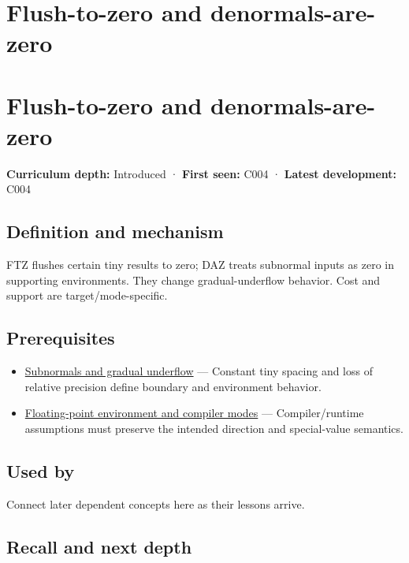 \hypertarget{appendix-e979eb012782}{}
\section*{Flush-to-zero and denormals-are-zero}
\section{Flush-to-zero and denormals-are-zero}\label{flush-to-zero-and-denormals-are-zero}

\textbf{Curriculum depth:} Introduced · \textbf{First seen:} C004 · \textbf{Latest development:} C004

\subsection{Definition and mechanism}\label{definition-and-mechanism}

FTZ flushes certain tiny results to zero; DAZ treats subnormal inputs as zero in supporting environments. They change gradual-underflow behavior. Cost and support are target/mode-specific.

\subsection{Prerequisites}\label{prerequisites}

\begin{itemize}
\tightlist
\item
  \hyperref[appendix-00a6e044c437]{Subnormals and gradual underflow} --- Constant tiny spacing and loss of relative precision define boundary and environment behavior.
\item
  \hyperref[appendix-f11d1a521253]{Floating-point environment and compiler modes} --- Compiler/runtime assumptions must preserve the intended direction and special-value semantics.
\end{itemize}

\subsection{Used by}\label{used-by}

Connect later dependent concepts here as their lessons arrive.

\subsection{Recall and next depth}\label{recall-and-next-depth}

